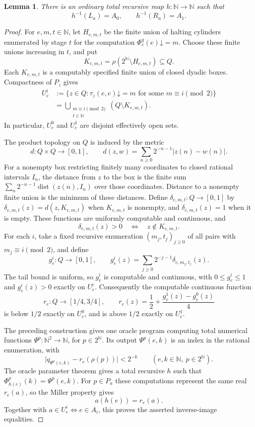 \documentclass[11pt]{article}
\newtheorem{lemma}[theorem]{Lemma}
\newcommand{\N}{\mathbb N}
\begin{document}
\begin{lemma}\label{lem:miller-cut-reduction}
There is an ordinary total recursive map $h:\N\to\N$ such that
\[
 h^{-1}(L_a)=A_0,\qquad h^{-1}(R_a)=A_1.
\]
\end{lemma}
\begin{proof}
For $e,m,t\in\N$, let $H_{e,m,t}$ be the finite union of halting
cylinders enumerated by stage $t$ for the computation
$\Phi_e^q(e)\mathord\downarrow=m$. Choose these finite unions increasing
in $t$, and put
\[
 K_{e,m,t}=\rho(2^{\N}\setminus H_{e,m,t})\subseteq Q.
\]
Each $K_{e,m,t}$ is a computably specified finite union of closed dyadic
boxes. Compactness of $P_z$ gives
\begin{align*}
 U_e^i
 &:=\{z\in Q:\tau_z(e,e)\mathord\downarrow=m
                      \text{ for some }m\equiv i\pmod2\}\\
 &=\bigcup_{\substack{m\equiv i\pmod2\\t\in\N}}
       (Q\setminus K_{e,m,t}).
\end{align*}
In particular, $U_e^0$ and $U_e^1$ are disjoint effectively open sets.

The product topology on $Q$ is induced by the metric
\[
 d:Q\times Q\to[0,1],\qquad
 d(z,w)=\sum_{n\geq0}2^{-n-1}|z(n)-w(n)|.
\]
For a nonempty box restricting finitely many coordinates to closed
rational intervals $I_n$, the distance from $z$ to the box is the
finite sum
$\sum_n2^{-n-1}\operatorname{dist}(z(n),I_n)$ over those coordinates.
Distance to a nonempty finite union is the minimum of these distances.
Define $\delta_{e,m,t}:Q\to[0,1]$ by
$\delta_{e,m,t}(z)=d(z,K_{e,m,t})$ when $K_{e,m,t}$ is nonempty, and
$\delta_{e,m,t}(z)=1$ when it is empty. These functions are uniformly
computable and continuous, and
\[
 \delta_{e,m,t}(z)>0\quad\Longleftrightarrow\quad
 z\notin K_{e,m,t}.
\]
For each $i$, take a fixed recursive enumeration
$(m_j,t_j)_{j\geq0}$ of all pairs with $m_j\equiv i\pmod2$, and define
\[
 g_e^i:Q\to[0,1],\qquad
 g_e^i(z)=\sum_{j\geq0}2^{-j-1}\delta_{e,m_j,t_j}(z).
\]
The tail bound is uniform, so $g_e^i$ is computable and continuous,
with $0\leq g_e^i\leq1$ and $g_e^i(z)>0$ exactly on $U_e^i$.
Consequently the computable continuous function
\[
 r_e:Q\to[1/4,3/4],\qquad
 r_e(z)=\frac12+\frac{g_e^1(z)-g_e^0(z)}4
\]
is below $1/2$ exactly on $U_e^0$, and
is above $1/2$ exactly on $U_e^1$.

The preceding construction gives one oracle program computing total
numerical functions $\Psi^p:\N^2\to\N$, for $p\in2^{\N}$.
Its output $\Psi^p(e,k)$ is an index in the rational enumeration,
with
\[
 \bigl|q_{\Psi^p(e,k)}-r_e(\rho(p))\bigr|<2^{-k}
 \qquad(e,k\in\N,\ p\in2^{\N}).
\]
The oracle parameter theorem gives a total recursive $h$ such that
$\Phi_{h(e)}^p(k)=\Psi^p(e,k)$. For $p\in P_a$ these computations
represent the same real $r_e(a)$, so the Miller property gives
\[
 a(h(e))=r_e(a).
\]
Together with $a\in U_e^i\Longleftrightarrow e\in A_i$, this proves
the asserted inverse-image equalities.
\end{proof}
\end{document}
